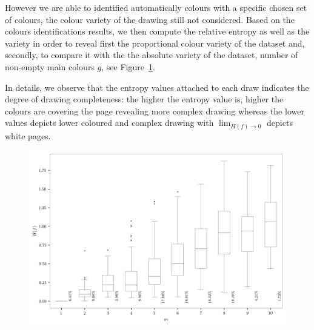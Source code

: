 \documentclass[11pt,a4paper]{article}
\begin{document}
However we are able to identified automatically colours with a specific chosen set of colours, the colour variety of the drawing still not considered. Based on the colours identifications results, we then compute the relative entropy as well as the variety in order to reveal first the proportional colour variety of the dataset and, secondly, to compare it with the the absolute variety of the dataset, number of non-empty main colours $g$, see Figure~\ref{fig:boxplotvariety}.

In details, we observe that the entropy values attached to each draw indicates the degree of drawing completeness: the higher the entropy value is, higher the colours are covering the page revealing more complex drawing whereas the lower values depicts lower coloured and complex drawing with $\lim_{H(f) \rightarrow 0}$ depicts white pages.



\begin{figure}[h!]
	\centering
	\includegraphics[width=\linewidth]{figures/colors-boxplot.png}
	\caption{}
	\label{fig:boxplotvariety}
\end{figure}
\end{document}
